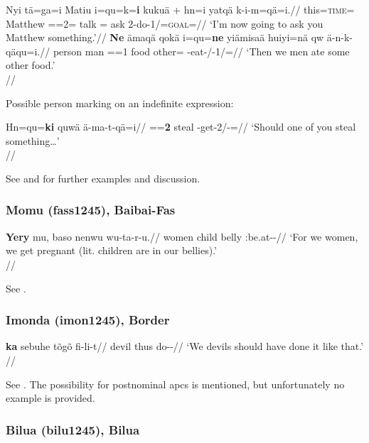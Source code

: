 \pex \label{ex:menyabpc}
\a \begingl
\gla Nyi tä=\ng{}ga=\ng{}i Matiu i=qu=k=\textbf{i} kuk\ng{}uä + hn=i yat\ng{}qä k-i-m=\ng{}qä=i.//
\Sg{} this=\textsc{time}=\Gvn{} Matthew \Dem=\M={2\Sg}=\Obj{} talk \Indf=\F{} ask 2\Sg-do-1\Sg/\Irr=\textsc{goal}=\Ind{}//
\glft `I'm now going to ask you Matthew something.'//
\endgl
\a\begingl
\gla \textbf{Ne} ämaqä qokä i=qu=\textbf{ne} yiämisa\ng{}ä huiyi=nä qw ä-n-k-qäqu=i.//
\Pl{} person man \Dem=\M={1\Pl} food other=\Foc{} \Cert{} \Ass-eat-\Pst/\Pfv{}-1\Pl/\Dso=\Ind{}//
\glft `Then we men ate some other food.'\\
\citep[30, (58/59)]{whitehead2006}//
\endgl
\xe

Possible person marking on an indefinite expression:

\ex \begingl
\gla Hn=qu=\textbf{ki} quwä ä-ma-t-qä=i//
\glb \Indf{}=\M=\textbf{2\Sg} steal \Ass-get-2\Sg/\Irr-\Generic=\Def{}//
\glft `Should one of you steal something\ldots'\\\citep[9, (18)]{whitehead2013}//
\endgl
\xe

See \citet[40, 46, 56f.]{whitehead2006} and \citet[9f., 18f.]{whitehead2013} for further examples and discussion.

\subsubsection{Momu (fass1245), Baibai-Fas}

\ex 
\begingl
\gla \textbf{Yery} mu, baso nenwu wu-ta-r-u.//
\Pl{} women child belly \Inan:be.at-\Pl\Sg{}-\Nmlz//
\glft `For we women, we get pregnant (lit. children are in our bellies).'\\\citep[568, (4)]{honeyman2016}//
\endgl
\xe

See \citet[169f., 242, 568]{honeyman2016}.

\subsubsection{Imonda (imon1245), Border}


\ex
\begingl
\gla \textbf{ka} sebuhe t\~{o}g\~{o} fi-li-t//
 devil thus do-\Emph-\Cf//
\glft `We devils should have done it like that.'\\\citep[61, (8)]{seiler1985}//
\endgl
\xe 

See \citet[44, 61f.]{seiler1985}. The possibility for postnominal \glspl{apc} is mentioned, but unfortunately no example is provided.

\subsubsection{Bilua (bilu1245), Bilua}

